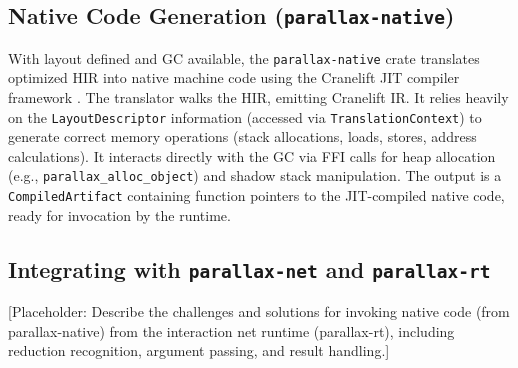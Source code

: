 \subsection{Native Code Generation (\texttt{parallax-native})}

With layout defined and GC available, the \texttt{parallax-native} crate translates optimized HIR into native machine code using the Cranelift JIT compiler framework \cite{Cranelift}. The translator walks the HIR, emitting Cranelift IR. It relies heavily on the \texttt{LayoutDescriptor} information (accessed via \texttt{TranslationContext}) to generate correct memory operations (stack allocations, loads, stores, address calculations). It interacts directly with the GC via FFI calls for heap allocation (e.g., \texttt{parallax\_alloc\_object}) and shadow stack manipulation. The output is a \texttt{CompiledArtifact} containing function pointers to the JIT-compiled native code, ready for invocation by the runtime.

\subsection{Integrating with \texttt{parallax-net} and \texttt{parallax-rt}}

[Placeholder: Describe the challenges and solutions for invoking native code (from parallax-native) from the interaction net runtime (parallax-rt), including reduction recognition, argument passing, and result handling.]